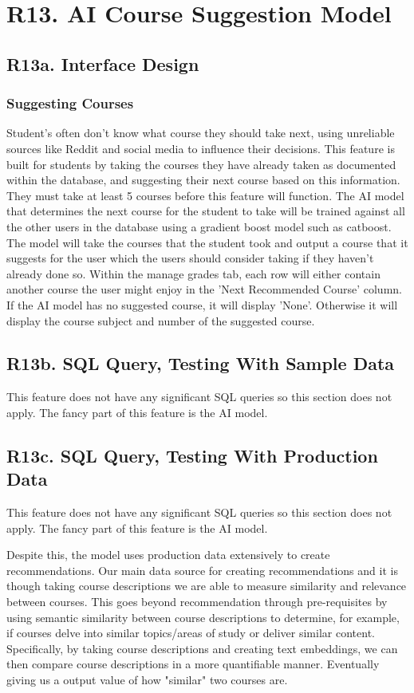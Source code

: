 \documentclass[12pt, a4paper]{article}
\begin{document}
\section*{R13. AI Course Suggestion Model}
\label{sec:R13}
\subsection*{R13a. Interface Design}
\subsubsection*{Suggesting Courses}
Student's often don't know what course they should take next, using unreliable sources like Reddit and social media to influence their decisions. This feature is built for students by taking the courses they have already taken as documented within the database, and suggesting their next course based on this information. They must take at least 5 courses before this feature will function. The AI model that determines the next course for the student to take will be trained against all the other users in the database using a gradient boost model such as catboost. The model will take the courses that the student took and output a course that it suggests for the user which the users should consider taking if they haven't already done so. Within the manage grades tab, each row will either contain another course the user might enjoy in the 'Next Recommended Course' column. If the AI model has no suggested course, it will display 'None'. Otherwise it will display the course subject and number of the suggested course.
\subsection*{R13b. SQL Query, Testing With Sample Data}
This feature does not have any significant SQL queries so this section does not apply. The fancy part of this feature is the AI model.
\subsection*{R13c. SQL Query, Testing With Production Data}
This feature does not have any significant SQL queries so this section does not apply. The fancy part of this feature is the AI model.

Despite this, the model uses production data extensively to create recommendations. Our main data source for creating recommendations and it is though taking course descriptions we are able to measure similarity and relevance between courses. This goes beyond recommendation through pre-requisites by using semantic similarity between course descriptions to determine, for example, if courses delve into similar topics/areas of study or deliver similar content. Specifically, by taking course descriptions and creating text embeddings, we can then compare course descriptions in a more quantifiable manner. Eventually giving us a output value of how "similar" two courses are. 
\end{document}
